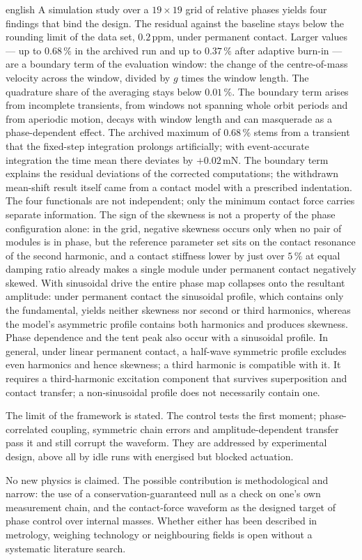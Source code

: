 \documentclass[12pt,a4paper]{report}
\begin{document}
\begin{otherlanguage*}{english}
A simulation study over a $19\times19$ grid of relative phases yields
four findings that bind the design. The residual against the baseline
stays below the rounding limit of the data set, $0{.}2\,\mathrm{ppm}$,
under permanent contact. Larger values --- up to
$0{.}68\,\%$ in the archived run and up to $0{.}37\,\%$ after adaptive
burn-in --- are a boundary term of the evaluation window: the change of
the centre-of-mass velocity across the window, divided by $g$ times the
window length. The quadrature share of the averaging stays below
$0{.}01\,\%$. The boundary term arises from incomplete transients, from
windows not spanning whole orbit periods and from aperiodic motion,
decays with window length and can masquerade as a phase-dependent
effect. The archived maximum of $0{.}68\,\%$ stems from a transient that
the fixed-step integration prolongs artificially; with event-accurate
integration the time mean there deviates by $+0{.}02\,\mathrm{mN}$. The
boundary term explains the residual deviations of the corrected
computations; the
withdrawn mean-shift result itself came from a contact model with a
prescribed indentation. The four functionals are not
independent; only the minimum contact force carries separate
information. The sign of the skewness is not a property of
the phase configuration alone: in the grid, negative skewness occurs only
when no pair of modules is in phase, but the reference parameter set sits
on the contact resonance of the second harmonic, and a contact stiffness
lower by just over $5\,\%$ at equal damping ratio already makes a single
module under permanent contact negatively skewed. With sinusoidal drive the
entire phase map collapses onto the resultant amplitude: under permanent
contact the sinusoidal profile, which contains only the fundamental,
yields neither skewness nor second or third harmonics, whereas the
model's asymmetric profile contains both harmonics and produces skewness.
Phase dependence and the tent peak also occur with a sinusoidal profile.
In general, under linear permanent contact, a half-wave symmetric profile
excludes even harmonics and hence skewness; a third harmonic is
compatible with it. It requires a third-harmonic excitation component
that survives superposition and contact transfer; a non-sinusoidal
profile does not necessarily contain one.

The limit of the framework is stated. The control tests the first
moment; phase-correlated coupling, symmetric chain errors and
amplitude-dependent transfer pass it and still corrupt the waveform.
They are addressed by experimental design, above all by idle runs with
energised but blocked actuation.

No new physics is claimed. The possible contribution is methodological
and narrow: the use of a conservation-guaranteed null as a check on one's
own measurement chain, and the contact-force waveform as the designed
target of phase control over internal masses. Whether either has been
described in metrology, weighing technology or neighbouring fields is
open without a systematic literature search.

\end{otherlanguage*}
\clearpage
\end{document}
